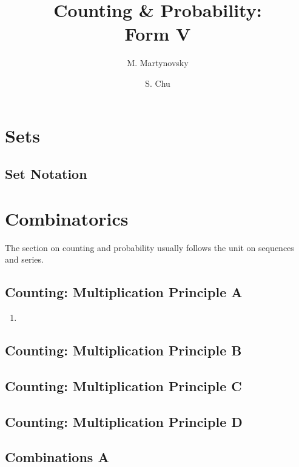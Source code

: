 \documentclass{amsbook}
\begin{document}
\title{Counting \& Probability:\\
    \Large Form V}

\author{M. Martynovsky}
\author{S. Chu}

\maketitle
\tableofcontents

\chapter{Sets}
\section{Set Notation}

\chapter{Combinatorics}
The section on counting and probability usually follows the unit on sequences and series. 
\section{Counting: Multiplication Principle A}
\begin{enumerate}
    \item 
\end{enumerate}
\section{Counting: Multiplication Principle B}

\section{Counting: Multiplication Principle C}

\section{Counting: Multiplication Principle D}

\section{Combinations A}
\end{document}
